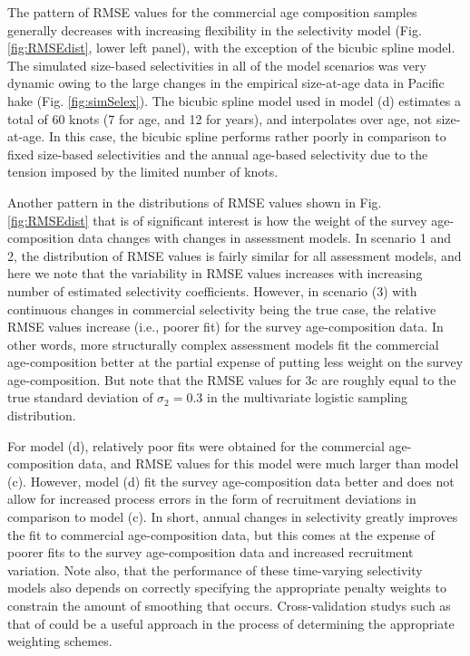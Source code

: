 \documentclass[review,letterpaper,10pt,authoryear]{elsarticle}
\begin{document}
The pattern of RMSE values for the commercial age composition samples generally decreases with increasing flexibility in the selectivity model (Fig. \ref{fig:RMSEdist}, lower left panel), with the exception of the bicubic spline model.  The simulated size-based selectivities in all of the model scenarios was very dynamic owing to the large changes in the empirical size-at-age data in Pacific hake (Fig. \ref{fig:simSelex}). The bicubic spline model used in model (d) estimates a total of 60 knots (7 for age, and 12 for years), and interpolates over age, not size-at-age.  In this case, the bicubic spline performs rather poorly in comparison to fixed size-based selectivities and the annual age-based selectivity due to the tension imposed by the limited number of knots.

Another pattern in the distributions of RMSE values shown in Fig. \ref{fig:RMSEdist} that is of significant interest is how the weight of the survey age-composition data changes with changes in assessment models.  In scenario 1 and 2, the distribution of RMSE values is fairly similar for all assessment models, and here we note that the variability in RMSE values increases with increasing number of estimated selectivity coefficients.  However, in scenario (3) with continuous changes in commercial selectivity being the true case, the relative RMSE values increase (i.e., poorer fit) for the survey age-composition data.  In other words, more structurally complex assessment models fit the commercial age-composition better at the partial expense of putting less weight on the survey age-composition.  But note that the RMSE values for 3c are roughly equal to the true standard deviation of $\sigma_2=0.3$ in the multivariate logistic sampling distribution.  

For model (d), relatively poor fits were obtained for the commercial age-composition data, and RMSE values for this model were much larger than model (c).  However, model (d) fit the survey age-composition data better and does not allow for increased process errors in the form of recruitment deviations in comparison to model (c).  In short, annual changes in selectivity greatly improves the fit to commercial age-composition data, but this comes at the expense of poorer fits to the survey age-composition data and increased recruitment variation. Note also, that the performance of these time-varying selectivity models also depends on correctly specifying the appropriate penalty weights to constrain the amount of smoothing that occurs.  Cross-validation studys such as that of \cite{maunder2011using} could be a useful approach in the process of determining the appropriate weighting schemes.
\end{document}
